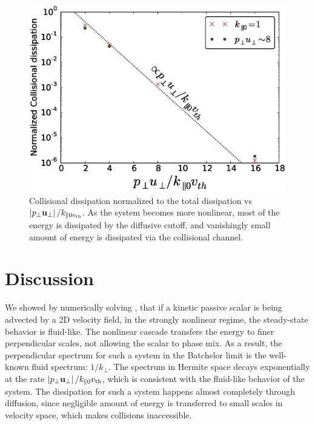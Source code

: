     \begin{figure}
    \begin{center}
        \includegraphics[width=14.8cm]{figs/phmixnlpp0/M100_normcoll.eps}
        \caption{Collisional dissipation normalized to the total dissipation vs
        $\left|p_\perp \mathbf{u_\perp}\right|/k_{\parallel0v_{\rm th}}$. As the system becomes more nonlinear, most of
        the energy is dissipated by the diffusive cutoff, and vanishingly small amount of energy is dissipated
        via the collisional channel.}
        \label{pp0:fig:normcoll}
    \end{center}
    \end{figure}

\section{Discussion}
    We showed by numerically solving , that if a
    kinetic passive scalar is being advected by a 2D velocity field, in the strongly
    nonlinear regime, the steady-state
    behavior is fluid-like. The nonlinear cascade
    transfers the energy to finer perpendicular
    scales, not allowing the scalar to phase mix. As a result, the perpendicular spectrum
    for such a system in the Batchelor limit is the well-known fluid spectrum:
    $1/k_\perp$. The spectrum in Hermite space decays exponentially at
    the rate $\left|p_\perp \mathbf{u_\perp}\right|/k_{\parallel0}v_{\rm th}$, which is consistent with the fluid-like behavior of
    the system. 
    The dissipation for
    such a system happens almost completely through diffusion, since negligible
    amount of energy is transferred to small scales in velocity space, which makes
    collisions inaccessible.

